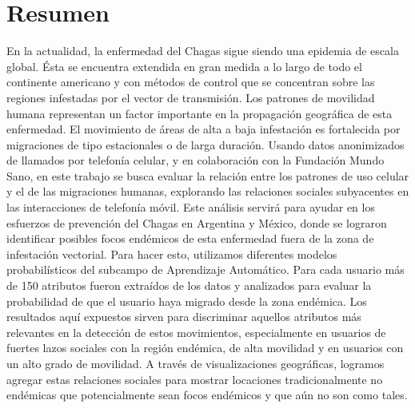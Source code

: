 \chapter{Resumen}
\label{cha:resumen}

En la actualidad, la enfermedad del Chagas sigue siendo una epidemia de escala global.
Ésta se encuentra extendida en gran medida a lo largo de todo el continente americano y con métodos de control que se concentran sobre las regiones infestadas por el vector de transmisión.
Los patrones de movilidad humana representan un factor importante en la propagación geográfica de esta enfermedad.
El movimiento de áreas de alta a baja infestación es fortalecida por migraciones de tipo estacionales o de larga duración.
Usando datos anonimizados de llamados por telefonía celular, y en colaboración con la Fundación Mundo Sano, en este trabajo se busca evaluar la relación entre los patrones de uso celular y el de las migraciones humanas, explorando las relaciones sociales subyacentes en las interacciones de telefonía móvil.
Este análisis servirá para ayudar en los esfuerzos de prevención del Chagas en Argentina y México, donde se lograron identificar posibles focos endémicos de esta enfermedad fuera de la zona de infestación vectorial.
Para hacer esto, utilizamos diferentes modelos probabilísticos del subcampo de Aprendizaje Automático.
Para cada usuario más de 150 atributos fueron extraídos de los datos y analizados para evaluar la probabilidad de que el usuario haya migrado desde la zona endémica.
Los resultados aquí expuestos sirven para discriminar aquellos atributos más relevantes en la detección de estos movimientos, especialmente en usuarios de fuertes lazos sociales con la región endémica, de alta movilidad y en usuarios con un alto grado de movilidad.
A través de visualizaciones geográficas, logramos agregar estas relaciones sociales para mostrar locaciones tradicionalmente no endémicas que potencialmente sean focos endémicos y que aún no son como tales.

